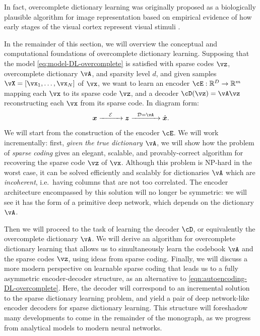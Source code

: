 \documentclass[../../book-main.tex]{subfiles}
\begin{document}
In fact, overcomplete dictionary learning was originally proposed as a biologically plausible algorithm for image representation based on empirical evidence of how early stages of the visual cortex represent visual stimuli \cite{Olshausen1996-ap,Olshausen1997-yv}. 

In the remainder of this section, we will overview the conceptual and computational foundations of overcomplete dictionary learning.
Supposing that the model \eqref{eq:model-DL-overcomplete} is satisfied with
sparse codes \(\vz\), overcomplete dictionary \(\vA\), and sparsity level \(d\),
and given samples \(\vX = [\vx_1, \dots, \vx_N]\) of \(\vx\), we want to learn
an encoder \(\cE : \R^D \to \R^m\) mapping each \(\vx\) to its {sparse code}
\(\vz\), and a decoder \(\cD(\vz) = \vA \vz\) reconstructing each \(\vx\) from
its sparse code. %
In diagram form:
\begin{equation}
\x \xrightarrow{\hspace{4mm} \mathcal{E} \hspace{4mm}}  \z \xrightarrow{\hspace{2mm} \mathcal{D} = \vA \hspace{2mm}}   \hat{\x}.  
\label{eqn:autoencoding-DL-overcomplete}
\end{equation}    

We will start from the construction of the encoder $\cE$.
We will work incrementally: first, \textit{given the true dictionary $\vA$}, we will show how the problem of \textit{sparse coding} gives an elegant, scalable, and provably-correct algorithm for recovering the sparse code $\vz$ of $\vx$.
Although this problem is NP-hard in the worst case, it can be solved efficiently and scalably for dictionaries $\vA$ which are \textit{incoherent}, i.e.\ having columns that are not too correlated.
The encoder architecture encompassed by this solution will no longer be symmetric: we will see it has the form of a primitive deep network, which depends on the dictionary $\vA$.

Then we will proceed to the task of learning the decoder $\cD$, or equivalently the overcomplete dictionary $\vA$.
We will derive an algorithm for overcomplete dictionary learning that allows us 
to simultaneously learn the codebook $\vA$ and the sparse codes $\vz$, using ideas from sparse coding.
Finally, we will discuss a more modern perspective on learnable sparse coding that leads us to a fully asymmetric encoder-decoder structure, as an alternative to \eqref{eqn:autoencoding-DL-overcomplete}.
Here, the decoder will correspond to an incremental solution to the sparse dictionary learning problem, and yield a pair of deep network-like encoder decoders for sparse dictionary learning.
This structure will foreshadow many developments to come in the remainder of the
monograph, as we progress from analytical models to modern neural networks.
\end{document}
